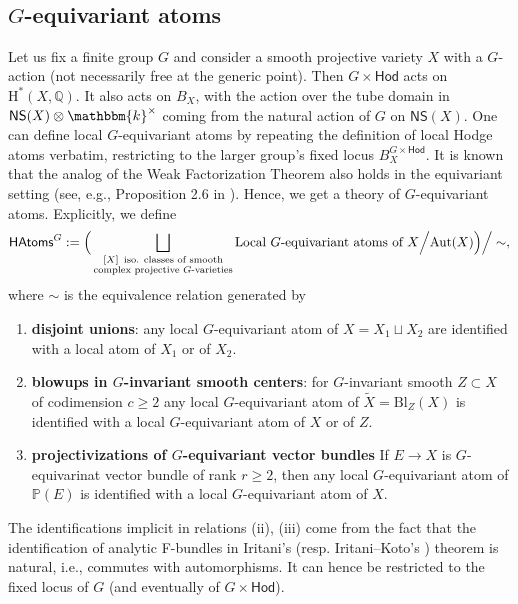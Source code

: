 \documentclass[12pt,a4paper]{amsart}
\theoremstyle{definition}
\theoremstyle{remark}
\newcommand{\Q}{\mathbb{Q}}
\begin{document}
\ 

\subsection{$G$-equivariant atoms}\label{sec:equivariant-atoms}

Let us fix a finite group $G$ and consider a smooth projective variety $X$ with a $G$-action (not necessarily free at the generic point).
Then $G\times \mathsf{Hod}$ acts on $\mathrm{H}^{\ast}(X,\Q)$. It also acts on $B_X$, with the action over the tube domain in $\mathsf{NS}(X)\otimes\mathbbm{k}^\times$ coming from the natural action of $G$ on $\mathsf{NS}(X)$. One can define local $G$-equivariant atoms
by repeating the definition of local Hodge atoms verbatim, restricting to the larger group's fixed locus $B_X^{G\times \mathsf{Hod}}$. It is known that the analog of the Weak Factorization Theorem also holds in the equivariant setting (see, e.g., Proposition 2.6 in \cite{Kresch2022}). Hence, we get a theory of $G$-equivariant atoms. Explicitly, we define 
$$  \mathsf{HAtoms}^G:=\Big(\bigsqcup_{\substack{
      [X]\text{\, iso. classes of smooth}\\
      \text{complex projective $G$-varieties}
    }}
    \text{Local  }G\text{-equivariant atoms of }X \Big/ \mathrm{Aut}(X)\Big) \Big/ \sim,$$
where $\sim$ is the equivalence relation generated by
\begin{enumerate}[label=(\roman*)]
  \item \textbf{disjoint unions}: any local $G$-equivariant atom of $X=X_1\sqcup X_2$ are identified with a local atom of $X_1$ or of $X_2$.
  \item \textbf{blowups in $G$-invariant smooth centers}: for $G$-invariant smooth $Z\subset X$ of codimension $c\ge 2$ any local $G$-equivariant atom of $\widetilde X=\mathrm{Bl}_Z(X)$ is identified with a local $G$-equivariant atom of $X$ or of $Z$.
  \item  \textbf{projectivizations of $G$-equivariant vector bundles} If $E\to X$ is $G$-equivarinat vector bundle of rank $r\ge 2$, then any local $G$-equivariant atom of $\mathbb P(E)$ is identified with a local $G$-equivariant atom of $X$.
\end{enumerate}
The identifications implicit in relations (ii), (iii) come from the fact that the identification of analytic F-bundles in Iritani's \cite{iritani2023quantumcohomologyblowups} (resp. Iritani--Koto's \cite{iritani2024quantumcohomologyprojectivebundles}) theorem is natural, i.e., commutes with automorphisms. It can hence be restricted to the fixed locus of $G$ (and eventually of $G\times\mathsf{Hod}$).
\end{document}
